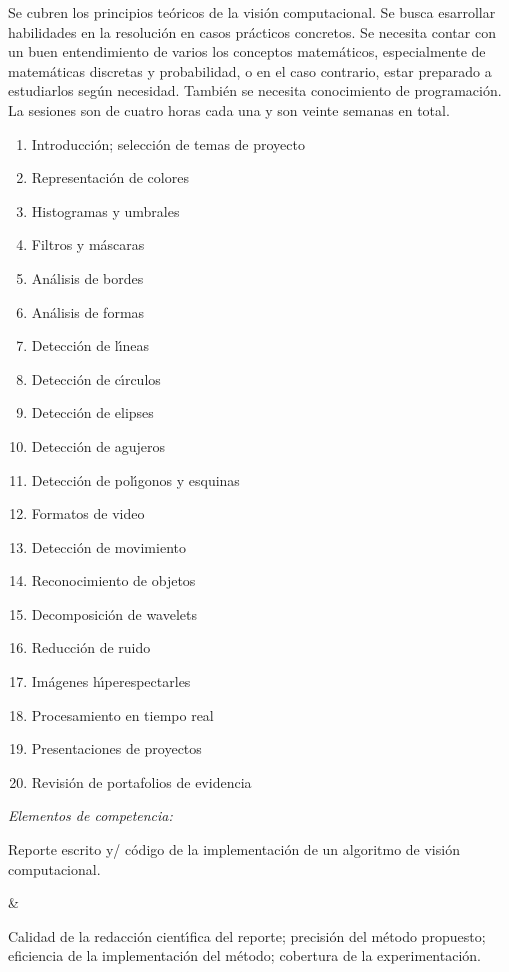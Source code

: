 \documentclass[10 pt]{article}
\begin{document}
Se cubren los principios te\'{o}ricos de la visi\'{o}n computacional.  Se
busca esarrollar habilidades en la resoluci\'{o}n en casos
pr\'{a}cticos concretos. Se necesita contar con un buen entendimiento
de varios los conceptos matem\'{a}ticos, especialmente de
matem\'{a}ticas discretas y probabilidad, o en el caso contrario,
estar preparado a estudiarlos seg\'{u}n necesidad. Tambi\'{e}n se
necesita conocimiento de programaci\'{o}n.  La sesiones son de cuatro
horas cada una y son veinte semanas en total.
\begin{enumerate}[itemsep=-3pt]
\item{Introducci\'{o}n; selecci\'{o}n de temas de proyecto}
\item{Representaci\'{o}n de colores}
\item{Histogramas y umbrales}
\item{Filtros y m\'{a}scaras}
\item{An\'{a}lisis de bordes}
\item{An\'{a}lisis de formas}
\item{Detecci\'{o}n de l\'{\i}neas}
\item{Detecci\'{o}n de c\'{\i}rculos}
\item{Detecci\'{o}n de elipses}
\item{Detecci\'{o}n de agujeros}
\item{Detecci\'{o}n de pol\'{\i}gonos y esquinas}
\item{Formatos de video}
\item{Detecci\'{o}n de movimiento}
\item{Reconocimiento de objetos}
\item{Decomposici\'{o}n de wavelets}
\item{Reducci\'{o}n de ruido}
\item{Im\'{a}genes h\'{\i}perespectarles}
\item{Procesamiento en tiempo real}
\item{Presentaciones de proyectos}
\item{Revisi\'{o}n de portafolios de evidencia}
\end{enumerate}

{\em Elementos de competencia:}



Reporte escrito y/ c\'{o}digo de la implementaci\'{o}n de un algoritmo de
visi\'{o}n computacional.

&

Calidad de la redacci\'{o}n cient\'{\i}fica del reporte; precisi\'{o}n
del m\'{e}todo propuesto; eficiencia de la implementaci\'{o}n del
m\'{e}todo; cobertura de la experimentaci\'{o}n.
\end{document}
